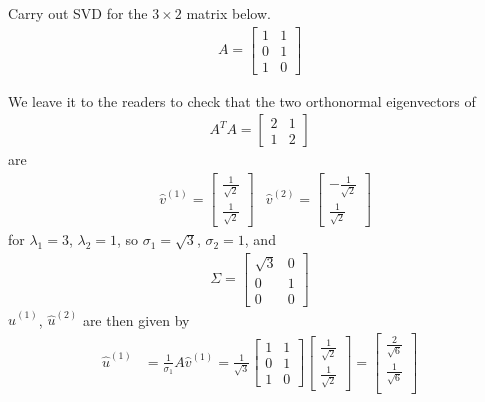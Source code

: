 \begin{exmp}
Carry out SVD for the $3 \times 2$ matrix below.
\begin{align*}
A =
\begin{bmatrix}
1 & 1 \\
0 & 1 \\
1 & 0
\end{bmatrix}
\end{align*}
\end{exmp}
\begin{solution}
We leave it to the readers to check that the two orthonormal eigenvectors of 
\begin{align*}
A^TA = 
\begin{bmatrix}
2 & 1 \\
1 & 2
\end{bmatrix}
\end{align*}
are 
\begin{align*}
& \hat{v}^{(1)} =
\begin{bmatrix}
\frac{1}{\sqrt{2}} \\
\frac{1}{\sqrt{2}}
\end{bmatrix}
& \hat{v}^{(2)} =
\begin{bmatrix}
-\frac{1}{\sqrt{2}} \\
\frac{1}{\sqrt{2}}
\end{bmatrix}
\end{align*}
for $\lambda_1 = 3$, $\lambda_2 = 1$, so $\sigma_1 = \sqrt{3}$, $\sigma_2 = 1$, and
\begin{align*}
\Sigma =
\begin{bmatrix}
\sqrt{3} & 0 \\
0 & 1 \\
0 & 0
\end{bmatrix}   
\end{align*}
$\hat{u}^{(1)}$, $\hat{u}^{(2)}$ are then given by
\begin{align*}
\hat{u}^{(1)} &= \frac{1}{\sigma_1} A\hat{v}^{(1)} = \frac{1}{\sqrt{3}}
\begin{bmatrix}
1 & 1 \\
0 & 1 \\
1 & 0
\end{bmatrix}
\begin{bmatrix}
\frac{1}{\sqrt{2}} \\
\frac{1}{\sqrt{2}}
\end{bmatrix}
=
\begin{bmatrix}
\frac{2}{\sqrt{6}} \\
\frac{1}{\sqrt{6}} \\

\end{bmatrix}
\end{align*}
\end{solution}
